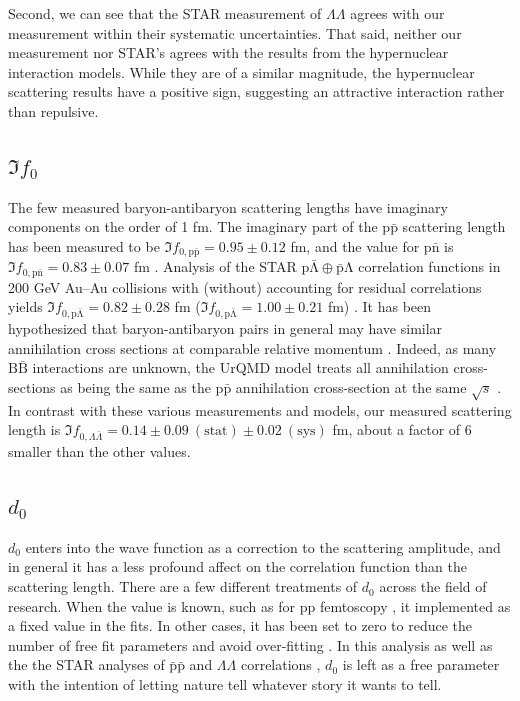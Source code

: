 Second, we can see that the STAR measurement of $\Lambda\Lambda$ agrees with our measurement within their systematic uncertainties.
That said, neither our measurement nor STAR's agrees with the results from the hypernuclear interaction models.
While they are of a similar magnitude, the hypernuclear scattering results have a positive sign, suggesting an attractive interaction rather than repulsive.

\subsection{$\Im f_0$}
\label{Imf0Result}

The few measured baryon-antibaryon scattering lengths have imaginary components on the order of 1 fm.
The imaginary part of the $\mathrm{p\bar{p}}$ scattering length has been measured to be $\Im f_{0,\mathrm{p\bar{p}}} = 0.95 \pm 0.12$ fm, and the value for $\mathrm{p\bar{n}}$ is $\Im f_{0,\mathrm{p\bar{n}}} = 0.83 \pm 0.07$ fm \cite{Mutchler:1988av}. 
Analysis of the STAR $\mathrm{p\bar{\Lambda} \oplus \bar{p}\Lambda}$ correlation functions in 200 GeV Au--Au \cite{Adams:2005ws} collisions with (without) accounting for residual correlations yields $\Im f_{0,\mathrm{p\bar{\Lambda}}} = 0.82 \pm 0.28$ fm ($\Im f_{0,\mathrm{p\bar{\Lambda}}} = 1.00 \pm 0.21$ fm) \cite{Kisiel:2014mma}.
It has been hypothesized that baryon-antibaryon pairs in general may have similar annihilation cross sections at comparable relative momentum \cite{Kisiel:2014mma}.
Indeed, as many $\mathrm{B\bar{B}}$ interactions are unknown, the UrQMD model treats all annihilation cross-sections as being the same as the $\mathrm{p\bar{p}}$ annihilation cross-section at the same $\sqrt{s}$ \cite{Bleicher:1999xi}.
In contrast with these various measurements and models, our measured scattering length is $\Im f_{0,\Lambda\bar{\Lambda}} = 0.14 \pm 0.09\ (\mathrm{stat}) \pm 0.02\ (\mathrm{sys})$ fm, about a factor of 6 smaller than the other values.

\subsection{$d_0$}

$d_0$ enters into the wave function as a correction to the scattering amplitude, and in general it has a less profound affect on the correlation function than the scattering length.
There are a few different treatments of $d_0$ across the field of research.
When the value is known, such as for pp femtoscopy \cite{Adam:2015vja}, it implemented as a fixed value in the fits.
In other cases, it has been set to zero to reduce the number of free fit parameters and avoid over-fitting \cite{Kisiel:2014mma, Shapoval:2014yha, Adams:2005ws}.
In this analysis as well as the the STAR analyses of $\mathrm{\bar{p}\bar{p}}$ and $\Lambda\Lambda$ correlations \cite{Adamczyk:2015hza, Adamczyk:2014vca}, $d_0$ is left as a free parameter with the intention of letting nature tell whatever story it wants to tell.


